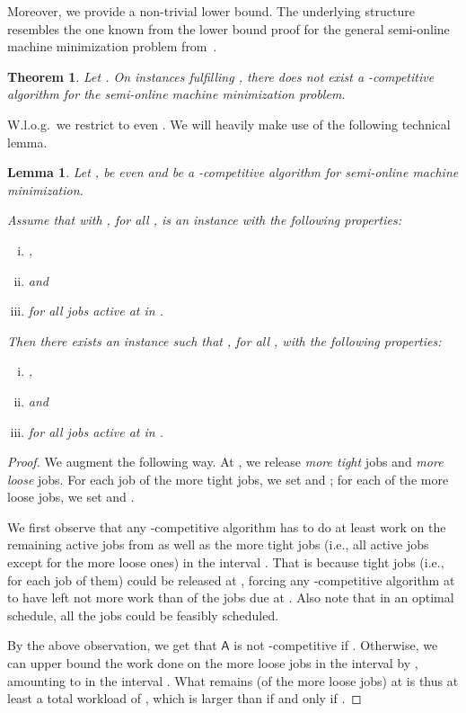 \documentclass[letterpaper,11pt]{article}
\newtheorem{theorem}{Theorem}
\newtheorem{lemma}{Lemma}
\newcommand{\A}{\ensuremath{\mathsf{A}}\xspace}
\begin{document}
Moreover, we provide a non-trivial lower bound. The underlying structure resembles the one known from the lower bound proof for the general semi-online machine minimization problem from~\cite{phillipsSTW02}.

\begin{theorem}\label{thm:LB}
Let . On instances fulfilling , there does not exist a -competitive algorithm for the semi-online machine minimization problem.
\end{theorem}

W.l.o.g.~we restrict to even . We will heavily make use of the following technical lemma.

\begin{lemma}
Let ,  be even and  be a -competitive algorithm for semi-online machine minimization.

Assume that  with , for all , is an instance with the following properties:
\begin{enumerate}[(i)]
  \item ,
  \item  and 
  \item  for all jobs  active at  in .
\end{enumerate}
Then there exists an instance  such that , for all , with the following properties:
\begin{enumerate}[(i)]
  \item ,
  \item  and 
  \item  for all jobs  active at  in .
\end{enumerate}
\end{lemma}
\begin{proof}We augment  the following way. At , we release  \textit{more tight} jobs and  \textit{more loose} jobs. For each job  of the more tight jobs, we set  and ; for each of the more loose jobs, we set  and .

We first observe that any -competitive algorithm  has to do at least  work on the remaining active jobs from  as well as the more tight jobs (i.e., all active jobs except for the more loose ones) in the interval . That is because  tight jobs (i.e.,  for each job  of them) could be released at , forcing any -competitive algorithm at  to have left not more work than  of the jobs due at . Also note that in an optimal schedule, all the jobs could be feasibly scheduled.

By the above observation, we get that \A is not -competitive if . Otherwise, we can upper bound the work done on the more loose jobs in the interval  by , amounting to  in the interval . What remains (of the more loose jobs) at  is thus at least a total workload of , which is larger than  if and only if .
\end{proof}
\end{document}
